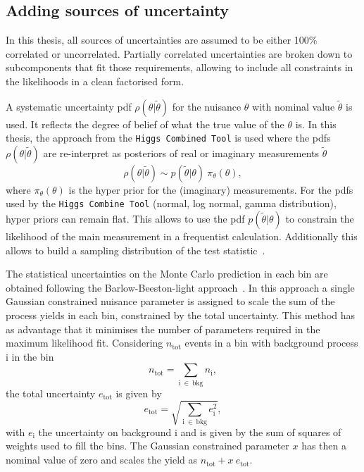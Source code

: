 \subsection{Adding sources of uncertainty}
\label{sec:Nuis}

In this thesis, all sources of uncertainties are assumed to be either 100\% correlated or uncorrelated. Partially correlated uncertainties are broken down to subcomponents that fit those requirements, allowing to include all constraints in the likelihoods in a clean factorised form. 

 A systematic uncertainty pdf $\rho(\theta|\tilde{\theta})$ for the nuisance $\theta$ with nominal value $\tilde{\theta}$ is used.
 It reflects the degree of belief of what the true value of the $\theta$ is.  In this thesis, the approach from the \texttt{Higgs Combined Tool} is used where the pdfs $\rho(\theta|\tilde{\theta})$ are re-interpret as posteriors of real or imaginary measurements $\tilde{\theta}$
 \begin{equation}
 	\rho(\theta|\tilde{\theta}) \sim p(\tilde{\theta}|\theta) \: \pi_{\theta}(\theta),
 \end{equation}
 where $\pi_{\theta}(\theta)$ is the hyper prior for the (imaginary) measurements. For the pdfs used by the \texttt{Higgs Combine Tool} (normal, log normal, gamma distribution), hyper priors can remain flat. This allows to use the pdf $p(\tilde{\theta}|\theta)$ to constrain the likelihood of the main measurement in a frequentist calculation. Additionally this allows to build a sampling distribution of the test statistic~\cite{CMS-NOTE-2011-005}. 
 
 The statistical uncertainties on the Monte Carlo prediction in each bin are obtained following the  Barlow-Beeston-light approach~\cite{Conway:2011in}. In this approach a single Gaussian constrained nuisance parameter is assigned to scale the sum of the process yields in each bin, constrained by the total uncertainty. This method has as advantage that it minimises the number of parameters required in the maximum likelihood fit.
 Considering $n_{\mathrm{tot}}$ events in a bin with background process i in the bin
 \begin{equation}
 n_{\mathrm{tot}} = \sum \limits_{\mathrm{i} \:\in \:\mathrm{bkg}} n_{\mathrm{i}},
 \end{equation}
 the total uncertainty $e_{\mathrm{tot}}$ is given by 
 \begin{equation}
 e_{\mathrm{tot}} = \sqrt{ \sum \limits_{\mathrm{i}\: \in\: \mathrm{bkg}} e_{\mathrm{i}}^2}, 
 \end{equation}
 with $ e_{\mathrm{i}}$ the uncertainty on background i and is given by the sum of  squares of weights used to fill the bins. The Gaussian constrained parameter $x$ has then a nominal value of zero and scales the yield as $n_{\mathrm{tot}}+x\:e_{\mathrm{tot}}$. 
 
